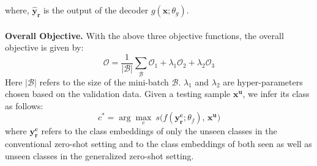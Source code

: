 \documentclass[10pt,twocolumn,letterpaper]{article}
\begin{document}
where, $\mathbf{\hat y_r}$ is the output of the decoder $g(\mathbf{x}; \theta_g)$.\\\\
\textbf{Overall Objective.}
With the above three objective functions, the overall objective is given by:
\begin{equation}
\mathcal{O}  = \dfrac{1}{|\mathcal{B}|}\sum_{\mathcal{B}}\mathcal{O}_1 + \lambda_1\mathcal{O}_2 + \lambda_2\mathcal{O}_3 
\end{equation}
Here $|\mathcal{B}|$ refers to the size of the mini-batch $\mathcal{B}$. $\lambda_1$ and $\lambda_2$ are hyper-parameters chosen based on the validation data. 
Given a testing sample $\mathbf{x^u}$, we infer its class as follows:
\begin{equation}
c^* = \arg\max_c \ s\big(f(\mathbf{y_r^c};\theta_f),\, \mathbf{x^u}\big)
\end{equation}
where $\mathbf{y_r^c}$ refers to the class embeddings of only the unseen classes in the conventional zero-shot setting and to the class embeddings of both seen as well as unseen classes in the generalized zero-shot setting.
\end{document}

